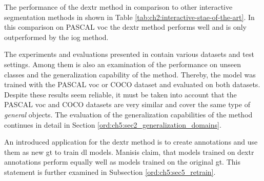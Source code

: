 The performance of the \gls{dextr} method in comparison to other interactive segmentation methods in shown in Table \ref{tab:ch2:interactive-stae-of-the-art}.
In this comparison on PASCAL \gls{voc} the \gls{dextr} method performs well and is only outperformed by the \gls{iog} method.

The experiments and evaluations presented in \cite{Man18-DEXTR} contain various datasets and test settings.
Among them is also an examination of the performance on unseen classes and the generalization capability of the method.
Thereby, the model was trained with the PASCAL \gls{voc} or COCO dataset and evaluated on both datasets.
Despite these results seem reliable, it must be taken into account that the PASCAL \gls{voc} and COCO datasets are very similar and cover the same type of \textit{general} objects.
The evaluation of the generalization capabilities of the method continues in detail in Section \ref{ord:ch5:sec2_generalization_domains}.

An introduced application for the \gls{dextr} method is to create annotations and use them as new \gls{gt} to train \gls{dl} models.
Manisis \etal claim, that models trained on \gls{dextr} annotations perform equally well as models trained on the original \gls{gt}\cite{Man18-DEXTR}.
This statement is further examined in Subsection \ref{ord:ch5:sec5_retrain}.
